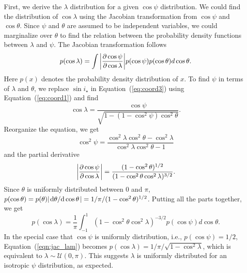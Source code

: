 \documentclass[twocolumn,times]{aastex631}
\begin{document}
First, we derive the $\lambda$ distribution for a given $\cos{\psi}$ distribution. We could find the distribution of $\cos{\lambda}$ using the Jacobian transformation from $\cos{\psi}$ and $\cos{\theta}$. Since $\psi$ and $\theta$ are assumed to be independent variables, we could marginalize over $\theta$ to find the relation between the probability density functions between $\lambda$ and $\psi$.
The Jacobian transformation follows
\begin{equation}
    p(\cos{\lambda}) = \int \abs{\pdv{\cos{\psi}}{\cos{\lambda}}} p(\cos{\psi}) p(\cos{\theta}) d\cos{\theta}.
\end{equation}
Here $p(x)$ denotes the probability density distribution of $x$.
To find $\psi$ in terms of $\lambda$ and $\theta$, we replace $\sin{i_\star}$ in Equation~(\ref{eq:coord3}) using Equation~(\ref{eq:coord1}) and find
\begin{equation}
    \cos{\lambda} = \frac{\cos{\psi}}{\sqrt{1-(1-\cos^2{\psi})\cos^2{\theta}}}.
\end{equation} 
Reorganize the equation, we get 
\begin{equation}
    \cos^2{\psi} = \frac{\cos^2{\lambda}\cos^2{\theta}-\cos^2{\lambda}}{\cos^2{\lambda}\cos^2{\theta}-1}
\end{equation}
and the partial derivative 
\begin{equation}
    \abs{\pdv{\cos{\psi}}{\cos{\lambda}}} = \frac{(1-\cos^2{\theta})^{1/2}}{(1-\cos^2{\theta}\cos^2{\lambda})^{3/2}}.
\end{equation}
Since $\theta$ is uniformly distributed between $0$ and $\pi$, $p(\cos{\theta}) = p(\theta) \abs{\dv*{\theta}{\cos{\theta}}} = 1/\pi/(1-\cos^2{\theta)^{1/2}}$. Putting all the parts together, we get
\begin{equation}\label{eqn:jac_lam}
    p(\cos{\lambda}) = \frac{1}{\pi} \int_{-1}^{1} (1-\cos^2{\theta}\cos^2{\lambda})^{-3/2} p(\cos{\psi}) d\cos{\theta}.
\end{equation}
In the special case that $\cos{\psi}$ is uniformly distribution, i.e., $p(\cos{\psi}) = 1/2$, Equation~(\ref{eqn:jac_lam}) becomes $p(\cos{\lambda}) = 1/\pi/\sqrt{1-\cos^2{\lambda}}$, which is equivalent to $\lambda \sim \mathcal{U}(0, \pi)$. This suggests $\lambda$ is uniformly distributed for an isotropic $\psi$ distribution, as expected.
\end{document}
